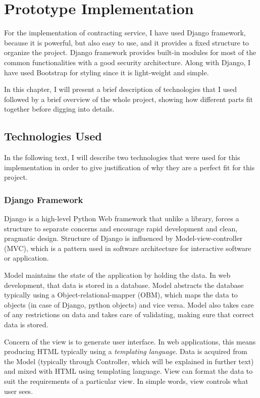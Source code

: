 \chapter{Prototype Implementation}
\label{chapter:implementation}

For the implementation of contracting service, I have used Django framework, because it is powerful, but also easy to use, and it provides a fixed structure to organize the project. Django framework provides built-in modules for most of the common functionalities with a good security architecture. Along with Django, I have used Bootstrap for styling since it is light-weight and simple.

In this chapter, I will present a brief description of technologies that I used followed by a brief overview of the whole project, showing how different parts fit together before digging into details.

\section{Technologies Used}
\label{section:technologiesUsed}

In the following text, I will describe two technologies that were used for this implementation in order to give justification of why they are a perfect fit for this project.

\subsection{Django Framework}

Django is a high-level Python Web framework that unlike a library, forces a structure to separate concerns and encourage rapid development and clean, pragmatic design. Structure of Django is influenced by Model-view-controller (MVC), which is a pattern used in software architecture for interactive software or application. 

Model maintains the state of the application by holding the data. In web development, that data is stored in a database. Model abstracts the database typically using a Object-relational-mapper (OBM),	 which maps the data to objects (in case of Django, python objects) and vice versa. Model also takes care of any restrictions on data and takes care of validating, making sure that correct data is stored.

Concern of the view is to generate user interface. In web applications, this means producing HTML typically using a \emph{templating language}. Data is acquired from the Model (typically through Controller, which will be explained in further text) and mixed with HTML using templating language. View can format the data to suit the requirements of a particular view. In simple words, view controls what user sees.

